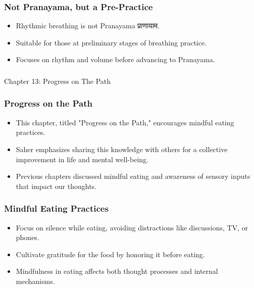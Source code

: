 \begin{frame}[fragile]\frametitle{Not Pranayama, but a Pre-Practice}
    \begin{itemize}
        \item Rhythmic breathing is not Pranayama प्राणायाम.
        \item Suitable for those at preliminary stages of breathing practice.
        \item Focuses on rhythm and volume before advancing to Pranayama.
    \end{itemize}
\end{frame}

\begin{frame}[fragile]\frametitle{}
\begin{center}
{\Large Chapter 13: Progress on The Path }
\end{center}
\end{frame}

\begin{frame}[fragile]\frametitle{Progress on the Path}
    \begin{itemize}
        \item This chapter, titled "Progress on the Path," encourages mindful eating practices.
        \item Saher emphasizes sharing this knowledge with others for a collective improvement in life and mental well-being.
        \item Previous chapters discussed mindful eating and awareness of sensory inputs that impact our thoughts.
    \end{itemize}
\end{frame}

\begin{frame}[fragile]\frametitle{Mindful Eating Practices}
    \begin{itemize}
        \item Focus on silence while eating, avoiding distractions like discussions, TV, or phones.
        \item Cultivate gratitude for the food by honoring it before eating.
        \item Mindfulness in eating affects both thought processes and internal mechanisms.
    \end{itemize}
\end{frame}

